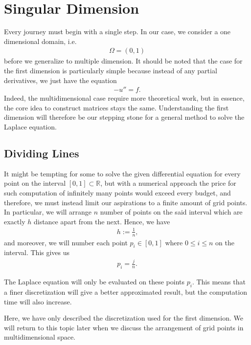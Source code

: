 \section{Singular Dimension}

Every journey must begin with a single step. In our case, we consider a one dimensional domain, i.e.
\begin{align*}
    \Omega = (0, 1)
\end{align*}
before we generalize to multiple dimension. It should be noted that the case for the first dimension is particularly simple because instead of any partial derivatives, we just have the equation
\begin{align*}
    - u'' = f \text{.}
\end{align*}
Indeed, the multidimensional case require more theoretical work, but in essence, the core idea to construct matrices stays the same. Understanding the first dimension will therefore be our stepping stone for a general method to solve the Laplace equation.

\subsection{Dividing Lines}

It might be tempting for some to solve the given differential equation for every point on the interval \([0, 1] \subset \mathbb{R}\), but with a numerical approach the price for such computation of infinitely many points would exceed every budget, and therefore, we must instead limit our aspirations to a finite amount of grid points. In particular, we will arrange \(n\) number of points on the said interval which are exactly \(h\) distance apart from the next. Hence, we have
\begin{align*}
	h := \frac{1}{n} \text{,}
\end{align*}
and moreover, we will number each point \(p_i \in [0, 1]\) where \(0 \leq i \leq n\)  on the interval. This gives us
\begin{align*}
	p_i = \frac{j}{n} \text{.}
\end{align*}

The Laplace equation will only be evaluated on these points \(p_i\). This means that a finer discretization will give a better approximated result, but the computation time will also increase.

Here, we have only described the discretization used for the first dimension. We will return to this topic later when we discuss the arrangement of grid points in multidimensional space.

